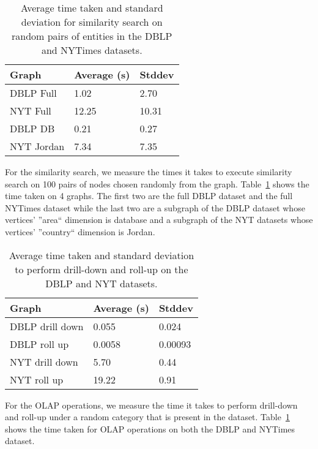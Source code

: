 \begin{table}
    \centering
    \begin{tabular}{| l | l | l |}
        \hline
        Graph & Average (s) & Stddev \\ \hline
        DBLP Full & 1.02 & 2.70 \\ \hline
        NYT Full & 12.25 & 10.31 \\ \hline
        DBLP DB & 0.21 & 0.27 \\ \hline
        NYT Jordan & 7.34 & 7.35 \\
        \hline
    \end{tabular}

    \caption{Average time taken and standard deviation for similarity search on random pairs of entities in the DBLP and NYTimes datasets.}
    \label{tab:similarity-result}
\end{table}

For the similarity search, we measure the times it takes to
execute similarity search on 100 pairs of nodes chosen
randomly from the graph. Table~\ref{tab:similarity-result} shows
the time taken on 4 graphs. The first two are
the full DBLP dataset and the full NYTimes dataset while
the last two are a subgraph of the DBLP dataset whose
vertices' ''area`` dimension is database and a subgraph of the NYT
datasets whose vertices' ''country`` dimension is Jordan.

\begin{table}
    \centering
    \begin{tabular}{| l | l | l |}
        \hline
        Graph & Average (s) & Stddev \\ \hline
        DBLP drill down & 0.055 & 0.024 \\ \hline
        DBLP roll up & 0.0058 & 0.00093 \\ \hline
        NYT drill down & 5.70 & 0.44 \\ \hline
        NYT roll up & 19.22 & 0.91 \\
        \hline
    \end{tabular}

    \caption{Average time taken and standard deviation to perform drill-down
    and roll-up on the DBLP and NYT datasets.}
    \label{tab:similarity-time}
\end{table}

For the OLAP operations, we measure the time it takes to
perform drill-down and roll-up under a random category
that is present in the dataset. Table~\ref{tab:similarity-result} shows
the time taken for OLAP operations on both the DBLP and NYTimes dataset.
